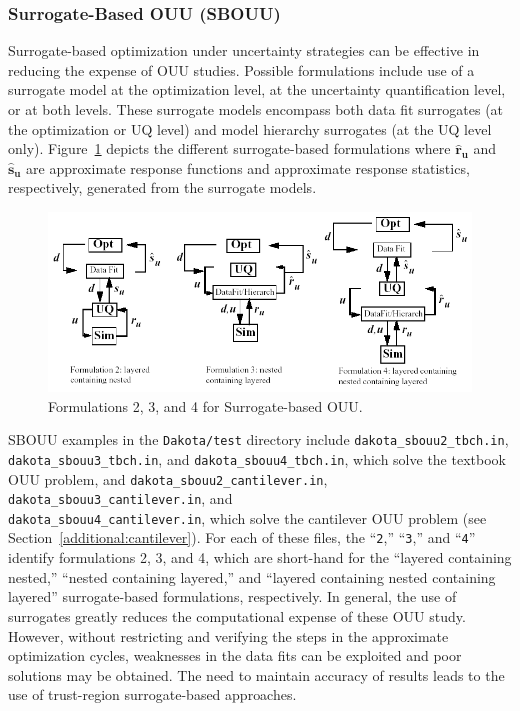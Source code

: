 \subsubsection{Surrogate-Based OUU (SBOUU)}\label{models:ex:ouu:sb}

Surrogate-based optimization under uncertainty strategies can be
effective in reducing the expense of OUU studies. Possible
formulations include use of a surrogate model at the optimization
level, at the uncertainty quantification level, or at both levels.
These surrogate models encompass both data fit surrogates (at the
optimization or UQ level) and model hierarchy surrogates (at the UQ
level only). Figure~\ref{models:ex:figure10} depicts the different
surrogate-based formulations where $\mathbf{\hat{r}_{u}}$ and
$\mathbf{\hat{s}_{u}}$ are approximate response functions and
approximate response statistics, respectively, generated from the
surrogate models.

\begin{figure}
  \centering
  \includegraphics[scale=0.65]{images/sbouu}
  \caption{Formulations 2, 3, and 4 for Surrogate-based OUU.}
  \label{models:ex:figure10}
\end{figure}

SBOUU examples in the \texttt{Dakota/test} directory include
\texttt{dakota\_sbouu2\_tbch.in},\\ \texttt{dakota\_sbouu3\_tbch.in},
and \texttt{dakota\_sbouu4\_tbch.in}, which solve the textbook OUU
problem, and \texttt{dakota\_sbouu2\_cantilever.in},
\texttt{dakota\_sbouu3\_cantilever.in}, and\\
\texttt{dakota\_sbouu4\_cantilever.in}, which solve the cantilever OUU
problem (see Section~\ref{additional:cantilever}). For each of these
files, the ``\texttt{2},'' ``\texttt{3},'' and ``\texttt{4}'' identify
formulations 2, 3, and 4, which are short-hand for the ``layered
containing nested,'' ``nested containing layered,'' and ``layered
containing nested containing layered'' surrogate-based formulations,
respectively. In general, the use of surrogates greatly reduces the
computational expense of these OUU study. However, without restricting
and verifying the steps in the approximate optimization cycles,
weaknesses in the data fits can be exploited and poor solutions may be
obtained. The need to maintain accuracy of results leads to the use of
trust-region surrogate-based approaches.

